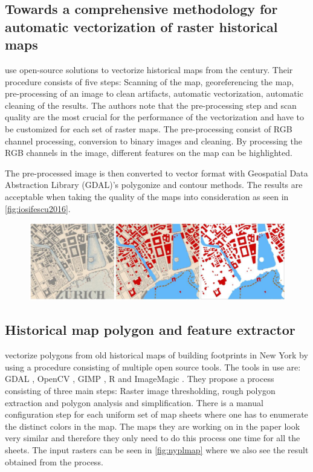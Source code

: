 \subsection{Towards a comprehensive methodology for automatic vectorization of raster historical maps}
\citet{Iosifescu2016} use open-source solutions to vectorize historical maps from the  century. Their procedure consists of five steps: Scanning of the map, georeferencing the map, pre-processing of an image to clean artifacts, automatic vectorization, automatic cleaning of the results. The authors note that the pre-processing step and scan quality are the most crucial for the performance of the vectorization and have to be customized for each set of raster maps. The pre-processing consist of RGB channel processing, conversion to binary images and cleaning. By processing the RGB channels in the image, different features on the map can be highlighted.

The pre-processed image is then converted to vector format with Geospatial Data Abstraction Library \cite{OSGeoa} (GDAL)'s polygonize and contour methods. The results are acceptable when taking the quality of the maps into consideration as seen in \autoref{fig:iosifescu2016}. 

\begin{figure}[H]
    \centering
    \includegraphics[width=0.9\linewidth]{fig/iosifescu2016.png}
    \label{fig:iosifescu2016}
\end{figure}

\subsection{Historical map polygon and feature extractor}

\citet{GiraldoArteaga2013} vectorize polygons from old historical maps of building footprints in New York by using a procedure consisting of multiple open source tools. The tools in use are: GDAL \cite{OSGeoa}, OpenCV \cite{OpenVCTeam2017}, GIMP \cite{GIMP2017}, R \cite{TheRFoundation2017} and ImageMagic \cite{ImageMagickStudioLLC2017}. They propose a process consisting of three main steps: Raster image thresholding, rough polygon extraction and polygon analysis and simplification. There is a manual configuration step for each uniform set of map sheets where one has to enumerate the distinct colors in the map. The maps they are working on in the paper look very similar and therefore they only need to do this process one time for all the sheets. The input rasters can be seen in \autoref{fig:nyplmap} where we also see the result obtained from the process.

